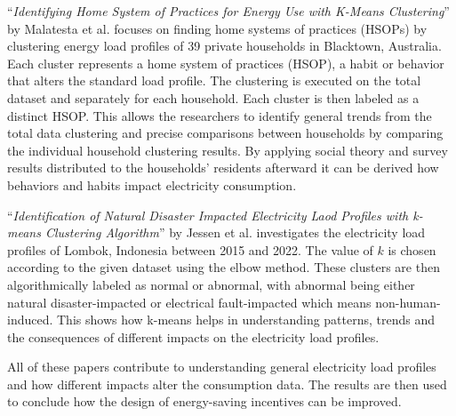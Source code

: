 \enquote{\textit{Identifying Home System of Practices for Energy Use with K-Means Clustering}} by Malatesta et al. \cite{MAL-HBP} focuses on finding home systems of practices (HSOPs) by clustering energy load profiles of 39 private households in Blacktown, Australia.
Each cluster represents a home system of practices (HSOP), a habit or behavior that alters the standard load profile.
The clustering is executed on the total dataset and separately for each household. 
Each cluster is then labeled as a distinct HSOP.
This allows the researchers to identify general trends from the total data clustering and precise comparisons between households by comparing the individual household clustering results.
By applying social theory and survey results distributed to the households' residents afterward it can be derived how behaviors and habits impact electricity consumption.

\enquote{\textit{Identification of Natural Disaster Impacted Electricity Laod Profiles with k-means Clustering Algorithm}} by Jessen et al. \cite{JES-IND} investigates the electricity load profiles of Lombok, Indonesia between 2015 and 2022.
The value of $k$ is chosen according to the given dataset using the elbow method.
These clusters are then algorithmically labeled as normal or abnormal, with abnormal being either natural disaster-impacted or electrical fault-impacted which means non-human-induced.
This shows how k-means helps in understanding patterns, trends and the consequences of different impacts on the electricity load profiles.

All of these papers contribute to understanding general electricity load profiles and how different impacts alter the consumption data.
The results are then used to conclude how the design of energy-saving incentives can be improved.
